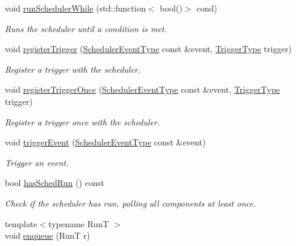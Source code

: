 \begin{DoxyCompactItemize}
void \hyperlink{structvt_1_1sched_1_1_scheduler_a9c130fc0ccbf237633420a7aa35069a4}{run\+Scheduler\+While} (std\+::function$<$ bool()$>$ cond)
\begin{DoxyCompactList}\small\item\em Runs the scheduler until a condition is met. \end{DoxyCompactList}\item 
void \hyperlink{structvt_1_1sched_1_1_scheduler_a818711c413c1ff0e843fffa877c52c78}{register\+Trigger} (\hyperlink{namespacevt_1_1sched_a54756ec39b60951d6765fcfa692d1616}{Scheduler\+Event\+Type} const \&event, \hyperlink{structvt_1_1sched_1_1_scheduler_aa0c06d6e1c31a5f1c3db474036ad7d29}{Trigger\+Type} trigger)
\begin{DoxyCompactList}\small\item\em Register a trigger with the scheduler. \end{DoxyCompactList}\item 
void \hyperlink{structvt_1_1sched_1_1_scheduler_ac6faee91832e52305c2e6ab28e1b3040}{register\+Trigger\+Once} (\hyperlink{namespacevt_1_1sched_a54756ec39b60951d6765fcfa692d1616}{Scheduler\+Event\+Type} const \&event, \hyperlink{structvt_1_1sched_1_1_scheduler_aa0c06d6e1c31a5f1c3db474036ad7d29}{Trigger\+Type} trigger)
\begin{DoxyCompactList}\small\item\em Register a trigger once with the scheduler. \end{DoxyCompactList}\item 
void \hyperlink{structvt_1_1sched_1_1_scheduler_a1bbc574a084b361bf0c88d24882ef08b}{trigger\+Event} (\hyperlink{namespacevt_1_1sched_a54756ec39b60951d6765fcfa692d1616}{Scheduler\+Event\+Type} const \&event)
\begin{DoxyCompactList}\small\item\em Trigger an event. \end{DoxyCompactList}\item 
bool \hyperlink{structvt_1_1sched_1_1_scheduler_ac7a9512a4a616d51915d5dfee84ff986}{has\+Sched\+Run} () const
\begin{DoxyCompactList}\small\item\em Check if the scheduler has run, polling all components at least once. \end{DoxyCompactList}\item 
{\footnotesize template$<$typename RunT $>$ }\\void \hyperlink{structvt_1_1sched_1_1_scheduler_a768062132bfdc473b84722a3d51c26f3}{enqueue} (RunT r)

\end{DoxyCompactItemize}
